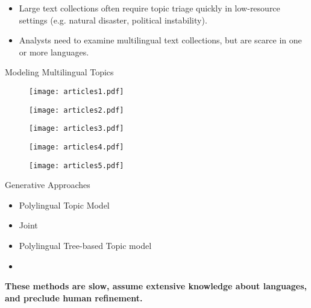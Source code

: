 \begin{frame}
\begin{itemize}
\item Large text collections often require topic triage quickly in low-resource settings (e.g. natural disaster, political instability). \pause
\item Analysts need to examine multilingual text collections, but are scarce in one or more languages.
\end{itemize}
\end{frame}

\begin{frame}{Modeling Multilingual Topics}
\begin{figure}
\begin{center}
\begin{overprint}
\centerline{\texttt{[image: articles1.pdf]}}
\centerline{\texttt{[image: articles2.pdf]}}
\centerline{\texttt{[image: articles3.pdf]}}
\centerline{\texttt{[image: articles4.pdf]}}
\centerline{\texttt{[image: articles5.pdf]}}
\end{overprint}
\end{center}
\end{figure}
\end{frame}

\begin{frame}{Generative Approaches}
\begin{itemize}
\item Polylingual Topic Model~\citep{mimno-2009}
\item Joint~\citep{jagarlamudi-2010}
\item Polylingual Tree-based Topic model~\citep{hu-2014-ptlda} 
\item {}~\citep{shi-2016} \pause
\vspace{1cm}
\end{itemize}
\textbf{These methods are slow, assume extensive knowledge about languages, and preclude human refinement.}
\end{frame}


